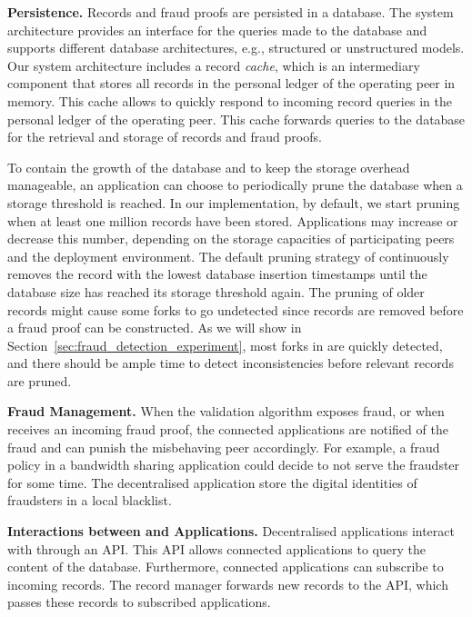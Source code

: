 \textbf{Persistence.}
Records and fraud proofs are persisted in a database.
The \ModelName{} system architecture provides an interface for the queries made to the database and supports different database architectures, e.g., structured or unstructured models.
Our system architecture includes a record \emph{cache}, which is an intermediary component that stores all records in the personal ledger of the operating peer in memory.
This cache allows \ModelName{} to quickly respond to incoming record queries in the personal ledger of the operating peer.
This cache forwards queries to the database for the retrieval and storage of records and fraud proofs.

To contain the growth of the database and to keep the storage overhead manageable, an application can choose to periodically prune the \ModelName{} database when a storage threshold is reached.
In our implementation, by default, we start pruning when at least one million records have been stored.
Applications may increase or decrease this number, depending on the storage capacities of participating peers and the deployment environment.
The default pruning strategy of \ModelName{} continuously removes the record with the lowest database insertion timestamps until the database size has reached its storage threshold again.
The pruning of older records might cause some forks to go undetected since records are removed before a fraud proof can be constructed.
As we will show in Section~\ref{sec:fraud_detection_experiment}, most forks in \ModelName{} are quickly detected, and there should be ample time to detect inconsistencies before relevant records are pruned.

\textbf{Fraud Management.}
When the validation algorithm exposes fraud, or when \ModelName{} receives an incoming fraud proof, the connected applications are notified of the fraud and can punish the misbehaving peer accordingly.
For example, a fraud policy in a bandwidth sharing application could decide to not serve the fraudster for some time.
The decentralised application store the digital identities of fraudsters in a local blacklist.

\textbf{Interactions between \ModelName{} and Applications.}
Decentralised applications interact with \ModelName{} through an API.
This API allows connected applications to query the content of the database.
Furthermore, connected applications can subscribe to incoming records.
The record manager forwards new records to the API, which passes these records to subscribed applications.

